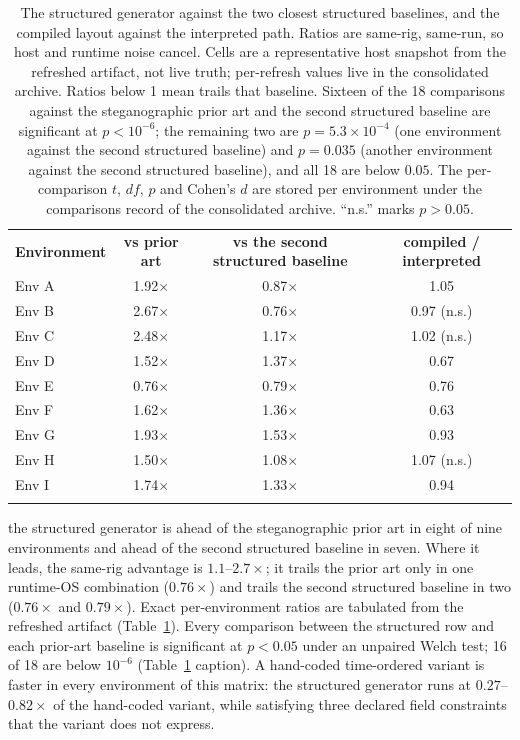 \documentclass{svproc}
\begin{document}
\begin{table}[!ht]
\caption{The structured generator against the two closest structured
baselines, and the compiled layout against the interpreted path. Ratios
are same-rig, same-run, so host and runtime noise cancel. Cells are a
representative host snapshot from the refreshed artifact, not live truth;
per-refresh values live in the consolidated archive. Ratios below 1
mean trails that baseline. Sixteen of the 18
comparisons against the steganographic prior art and the second structured baseline are significant
at $p<10^{-6}$; the remaining two are $p=5.3\times10^{-4}$ (one environment against
the second structured baseline) and $p=0.035$ (another environment against the second structured baseline), and all
18 are below $0.05$. The per-comparison $t$, $df$, $p$ and Cohen's $d$ are
stored per environment under the comparisons record of
the consolidated archive. ``n.s.'' marks $p>0.05$.}
\label{tab:paired}
\centering\footnotesize
\begin{tabular*}{\columnwidth}{@{\extracolsep{\fill}}lccc}
\hline\noalign{\smallskip}
\textbf{Environment} & \textbf{vs prior art} &
\textbf{vs the second structured baseline} & \textbf{compiled / interpreted} \\
\noalign{\smallskip}\hline\noalign{\smallskip}
Env A      & 1.92$\times$ & 0.87$\times$ & 1.05 \\
Env B      & 2.67$\times$ & 0.76$\times$ & 0.97 (n.s.) \\
Env C      & 2.48$\times$ & 1.17$\times$ & 1.02 (n.s.) \\
Env D      & 1.52$\times$ & 1.37$\times$ & 0.67 \\
Env E      & 0.76$\times$ & 0.79$\times$ & 0.76 \\
Env F      & 1.62$\times$ & 1.36$\times$ & 0.63 \\
Env G      & 1.93$\times$ & 1.53$\times$ & 0.93 \\
Env H      & 1.50$\times$ & 1.08$\times$ & 1.07 (n.s.) \\
Env I      & 1.74$\times$ & 1.33$\times$ & 0.94 \\
\noalign{\smallskip}\hline
\end{tabular*}
\end{table}

the structured generator is ahead of the steganographic prior art in eight of nine environments and ahead of the second structured baseline in seven. Where it leads, the same-rig advantage is $1.1$--$2.7\times$; it trails the prior art only in one runtime-OS combination ($0.76\times$) and trails the second structured baseline in two ($0.76\times$ and $0.79\times$). Exact per-environment ratios are tabulated from the refreshed artifact (Table~\ref{tab:paired}). Every comparison between the structured row and each prior-art baseline is significant at $p<0.05$ under an unpaired Welch test; 16 of 18 are below $10^{-6}$ (Table~\ref{tab:paired} caption). A hand-coded time-ordered variant is faster in every environment of this matrix: the structured generator runs at $0.27$--$0.82\times$ of the hand-coded variant, while satisfying three declared field constraints that the variant does not express.
\end{document}
